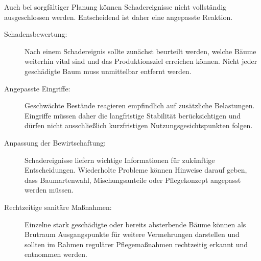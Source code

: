 \documentclass[twocolumn, bibliography=totoc, abstract=true]{scrartcl}
\begin{document}
Auch bei sorgfältiger Planung können Schadereignisse nicht vollständig ausgeschlossen werden. Entscheidend ist daher eine angepasste Reaktion.

\begin{description}
\item[Schadensbewertung:] Nach einem Schadereignis sollte zunächst beurteilt werden, welche Bäume weiterhin vital sind und das Produktionsziel erreichen können. Nicht jeder geschädigte Baum muss unmittelbar entfernt werden.
\item[Angepasste Eingriffe:] Geschwächte Bestände reagieren empfindlich auf zusätzliche Belastungen. Eingriffe müssen daher die langfristige Stabilität berücksichtigen und dürfen nicht ausschließlich kurzfristigen Nutzungsgesichtspunkten folgen.
\item[Anpassung der Bewirtschaftung:] Schadereignisse liefern wichtige Informationen für zukünftige Entscheidungen. Wiederholte Probleme können Hinweise darauf geben, dass Baumartenwahl, Mischungsanteile oder Pflegekonzept angepasst werden müssen.
\item[Rechtzeitige sanitäre Maßnahmen:] Einzelne stark geschädigte oder bereits absterbende Bäume können als Brutraum Ausgangspunkte für weitere Vermehrungen darstellen und sollten im Rahmen regulärer Pflegemaßnahmen rechtzeitig erkannt und entnommen werden.
\end{description}


\end{document}

